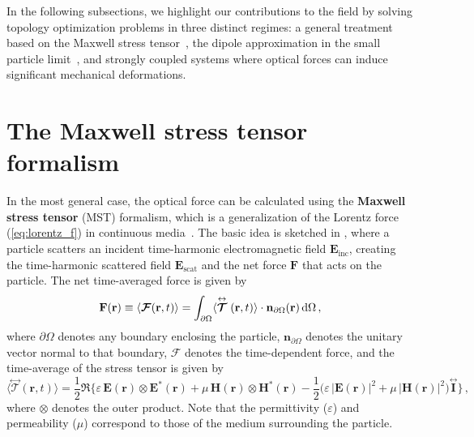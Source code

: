  In the following subsections, we highlight our contributions to the field by solving topology optimization problems in three distinct regimes: a general treatment based on the Maxwell stress tensor~\cite{ownpub2}, 
 the dipole approximation in the small particle limit~\cite{ownpub1, ownpub3}, and strongly coupled systems where optical forces can induce significant mechanical deformations.
\section{The Maxwell stress tensor formalism~\cite{ownpub2}}\label{sec:engi}

In the most general case, the optical force can be calculated using the \textbf{Maxwell stress tensor} (MST) formalism, which is a generalization of the Lorentz force (\eqref{eq:lorentz_f}) in continuous media~\cite{novotny}.
The basic idea is sketched in , where
a particle scatters an incident time-harmonic electromagnetic field $\mathbf{E}_\text{inc}$, creating the time-harmonic scattered field $\mathbf{E}_\text{scat}$ and the net force $\mathbf{F}$ that acts
on the particle. The net time-averaged force is given by~\cite{novotny}
\begin{equation}\label{eq:f_MST}
    \mathbf{F}(\mathbf{r}) \equiv \langle\bm{\mathcal{F}}(\mathbf{r}, t)\rangle=\int_{\partial \Omega}\langle\stackrel{\leftrightarrow}{\bm{\mathcal{T}}}(\mathbf{r}, t)\rangle \cdot \mathbf{n}_{\partial \Omega}(\mathbf{r}) \mathop{}\!\text{d} \Omega\,,
\end{equation}
where $\partial \Omega$ denotes any boundary enclosing the particle, $\mathbf{n}_{\partial \Omega}$ denotes the unitary vector normal to that boundary, $\bm{\mathcal{F}}$ denotes the time-dependent force, and
the time-average of the stress tensor is given by
\begin{equation}
        \langle \stackrel{\leftrightarrow}{\bm{\mathcal{T}}}(\mathbf{r}, t) \rangle 
        = \frac{1}{2} \Re \Big\{ 
            \varepsilon\, \mathbf{E}(\mathbf{r}) \otimes \mathbf{E}^*(\mathbf{r})
            + \mu\, \mathbf{H}(\mathbf{r}) \otimes \mathbf{H}^*(\mathbf{r})
         - \frac{1}{2} \big( \varepsilon\, |\mathbf{E}(\mathbf{r})|^2 + \mu\, |\mathbf{H}(\mathbf{r})|^2 \big) 
        \stackrel{\leftrightarrow}{\mathbf{I}} \Big\}\,,
\end{equation}
where $\otimes$ denotes the outer product. Note that the permittivity ($\varepsilon$) and permeability ($\mu$) correspond to those of the medium surrounding the particle.

